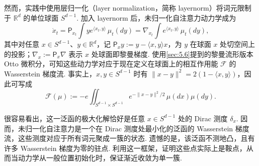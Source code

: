 然而，实践中使用层归一化（layer normalization，简称 layernorm）将词元限制于 $\mathbb R^d$ 的单位球面 $S^{d-1}$. 加入 layernorm 后，未归一化自注意力动力学成为
$$
\dot x_t=\mathsf P_{x_t}\int ye^{\langle x_t,y\rangle}\,\mu_t(dy)
=\nabla_{x_t}\int e^{\langle x_t,y\rangle}\,\mu_t(dy),
$$
其中对任意 $x\in S^{d-1}$、$y\in\mathbb R^d$，记 $\mathsf P_xy:=y-\langle x,y\rangle x$，为 $y$ 在球面 $x$ 处切空间上的投影；$\nabla_x:=\mathsf P_x\nabla$ 表示 $x$ 处球面即黎曼梯度. 使用\autoref{sec:5.6}提到的黎曼流形版本 Otto 微积分，可知这些动力学对应于现在定义在球面上的相互作用能 $\mathcal F$ 的 Wasserstein 梯度流. 事实上，$x,y\in S^{d-1}$ 时有 $\|x-y\|^2=2(1-\langle x,y\rangle)$，因此可写成
\begin{equation}\label{eq:6.29}
\mathcal F(\mu):=-e\iint_{S^{d-1}\times S^{d-1}}
e^{-\|x-y\|^2/2}\,\mu(dx)\mu(dy).
\end{equation}

很容易看出，这一泛函的极大化解恰好是任意 $x\in S^{d-1}$ 处的 Dirac 测度 $\delta_x$. 因而，未归一化自注意力是一个在 Dirac 测度处最小化的泛函的 Wasserstein 梯度流，这些测度对应于所有词元聚成一簇的状态. 遗憾的是，该泛函不测地凸，且有许多 Wasserstein 梯度为零的驻点. 利用这一框架，\cite{ref95,ref144}证明这些点实际上是鞍点，从而当动力学从一般位置初始化时，保证渐近收敛为单一簇.
